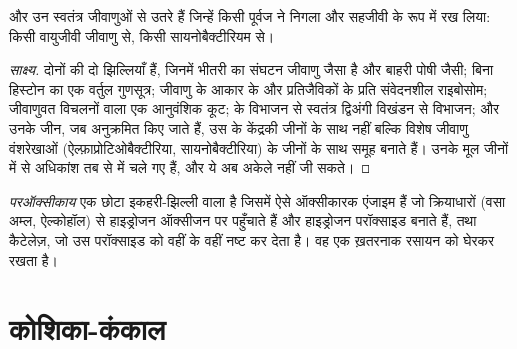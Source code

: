 \begin{proposition}[अंतःसहजीवी उद्गम]\label{prop:b1:eukaryotic-cell:endosymbiosis}
 और  उन स्वतंत्र जीवाणुओं से उतरे हैं जिन्हें किसी
पूर्वज  ने निगला और सहजीवी के रूप में रख लिया:
 किसी वायुजीवी जीवाणु से,  किसी सायनोबैक्टीरियम से।
\end{proposition}
\begin{proof}[साक्ष्य]
दोनों  की दो झिल्लियाँ हैं, जिनमें भीतरी का संघटन जीवाणु जैसा
है और बाहरी पोषी जैसी; बिना हिस्टोन का एक वर्तुल गुणसूत्र; जीवाणु के
आकार के और प्रतिजैविकों के प्रति संवेदनशील राइबोसोम; जीवाणुवत विचलनों
वाला एक आनुवंशिक कूट;  के विभाजन से स्वतंत्र द्विअंगी विखंडन से
विभाजन; और उनके जीन, जब अनुक्रमित किए जाते हैं, उस  के केंद्रकी
जीनों के साथ नहीं बल्कि विशेष जीवाणु वंशरेखाओं (ऐल्फ़ाप्रोटिओबैक्टीरिया,
सायनोबैक्टीरिया) के जीनों के साथ समूह बनाते हैं। उनके मूल जीनों में से
अधिकांश तब से  में चले गए हैं, और ये  अब अकेले नहीं जी
सकते।
\end{proof}

\begin{definition}[परऑक्सीकाय]\label{def:b1:eukaryotic-cell:peroxisome}
\emph{परऑक्सीकाय} एक छोटा इकहरी-झिल्ली वाला 
है जिसमें ऐसे ऑक्सीकारक एंजाइम हैं जो क्रियाधारों (वसा अम्ल, ऐल्कोहॉल)
से हाइड्रोजन ऑक्सीजन पर पहुँचाते हैं और हाइड्रोजन परॉक्साइड बनाते हैं,
तथा कैटेलेज़, जो उस परॉक्साइड को वहीं के वहीं नष्ट कर देता है। वह एक
ख़तरनाक रसायन को घेरकर रखता है।
\end{definition}

\section{कोशिका-कंकाल}

